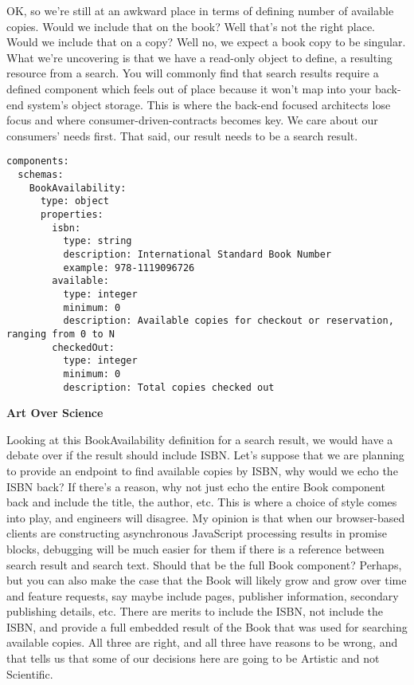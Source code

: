 OK, so we're still at an awkward place in terms of defining number of available copies.  Would we include that on the book?  Well that's not the right place.  Would we include that on a copy?  Well no, we expect a book copy to be singular.  What we're uncovering is that we have a read-only object to define, a resulting resource from a search.  You will commonly find that search results require a defined component which feels out of place because it won't map into your back-end system's object storage.  This is where the back-end focused architects lose focus and where consumer-driven-contracts becomes key.  We care about our consumers' needs first.  That said, our result needs to be a search result.

\begin{minipage}{\linewidth}
\begin{code}
\begin{lstlisting}[belowskip=-\baselineskip]
components:
  schemas:
    BookAvailability:
      type: object
      properties:
        isbn:
          type: string
          description: International Standard Book Number
          example: 978-1119096726
        available:
          type: integer
          minimum: 0
          description: Available copies for checkout or reservation, ranging from 0 to N
        checkedOut:
          type: integer
          minimum: 0
          description: Total copies checked out
\end{lstlisting}
\end{code}
\end{minipage}

\begin{sidebar}
\begin{center}
\textbf{Art Over Science}
\end{center}

Looking at this BookAvailability definition for a search result, we would have a debate over if the result should include ISBN.  Let's suppose that we are planning to provide an endpoint to find available copies by ISBN, why would we echo the ISBN back?  If there's a reason, why not just echo the entire Book component back and include the title, the author, etc.  This is where a choice of style comes into play, and engineers will disagree.  My opinion is that when our browser-based clients are constructing asynchronous JavaScript processing results in promise blocks, debugging will be much easier for them if there is a reference between search result and search text.  Should that be the full Book component?  Perhaps, but you can also make the case that the Book will likely grow and grow over time and feature requests, say maybe include pages, publisher information, secondary publishing details, etc.  There are merits to include the ISBN, not include the ISBN, and provide a full embedded result of the Book that was used for searching available copies.  All three are right, and all three have reasons to be wrong, and that tells us that some of our decisions here are going to be Artistic and not Scientific.
\end{sidebar}
